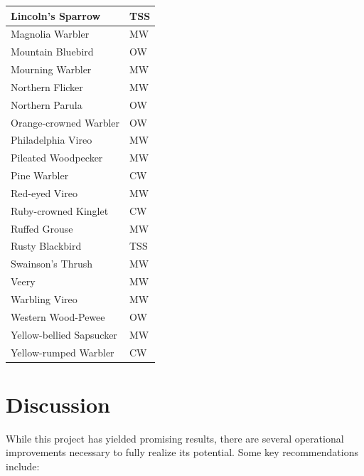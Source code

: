 \documentclass[
  letterpaper,
  DIV=11,
  numbers=noendperiod,
  oneside]{scrartcl}
\begin{document}
\begin{table}
\begin{tabular}{l|l}
\hline
Lincoln's Sparrow & TSS\\
\hline
Magnolia Warbler & MW\\
\hline
Mountain Bluebird & OW\\
\hline
Mourning Warbler & MW\\
\hline
Northern Flicker & MW\\
\hline
Northern Parula & OW\\
\hline
Orange-crowned Warbler & OW\\
\hline
Philadelphia Vireo & MW\\
\hline
Pileated Woodpecker & MW\\
\hline
Pine Warbler & CW\\
\hline
Red-eyed Vireo & MW\\
\hline
Ruby-crowned Kinglet & CW\\
\hline
Ruffed Grouse & MW\\
\hline
Rusty Blackbird & TSS\\
\hline
Swainson's Thrush & MW\\
\hline
Veery & MW\\
\hline
Warbling Vireo & MW\\
\hline
Western Wood-Pewee & OW\\
\hline
Yellow-bellied Sapsucker & MW\\
\hline
Yellow-rumped Warbler & CW\\
\hline
\end{tabular}
\end{table}

\hypertarget{discussion}{%
\section{Discussion}\label{discussion}}

While this project has yielded promising results, there are several
operational improvements necessary to fully realize its potential. Some
key recommendations include:
\end{document}
